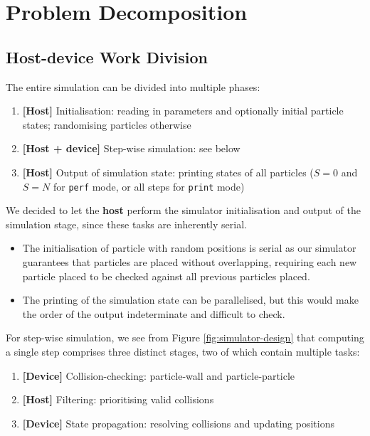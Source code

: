 \documentclass[12pt]{article}
\begin{document}
\pagebreak

\section{Problem Decomposition}

\subsection{Host-device Work Division}
The entire simulation can be divided into multiple phases:
\begin{enumerate}
    \item \textbf{[Host]} Initialisation: reading in parameters and optionally initial particle states; randomising particles otherwise
    \item \textbf{[Host + device]} Step-wise simulation: see below
    \item \textbf{[Host]} Output of simulation state: printing states of all particles ($S=0$ and $S=N$ for \texttt{perf} mode, or all steps for \texttt{print} mode)
\end{enumerate}

We decided to let the \textbf{host} perform the simulator initialisation and output of the simulation stage, since these tasks are inherently serial.
\begin{itemize}
    \item The initialisation of particle with random positions is serial as our simulator guarantees that particles are placed without overlapping, requiring each new particle placed to be checked against all previous particles placed.
    \item The printing of the simulation state can be parallelised, but this would make the order of the output indeterminate and difficult to check.
\end{itemize}

For step-wise simulation, we see from Figure \ref{fig:simulator-design} that computing a single step comprises three distinct stages, two of which contain multiple tasks:
\begin{enumerate}
    \item \textbf{[Device]} Collision-checking: particle-wall and particle-particle
    \item \textbf{[Host]} Filtering: prioritising valid collisions
    \item \textbf{[Device]} State propagation: resolving collisions and updating positions
\end{enumerate}
\end{document}
